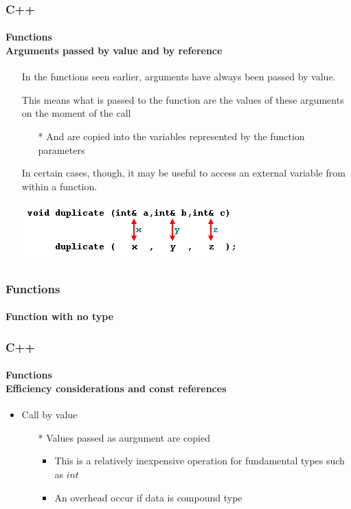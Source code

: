 \documentclass[hyperref={pdfpagelabels=true}]{beamer}
\begin{document}
\begin{frame}
\frametitle{C++}
\framesubtitle{{\small Functions} \\ {\scriptsize Arguments passed by value and by reference }}
\begin{itemize}
\item[\ding{39}] In the functions seen earlier, arguments have always been passed by value.
\item[\ding{39}] This means what is passed to the function are the values of these arguments on the moment of the call
  \begin{itemize}
  \item[*] And are copied into the variables represented by the function parameters
  \end{itemize}
\item[\ding{39}] In certain cases, though, it may be useful to access an external variable from within a function. 
\begin{center}
\includegraphics[width=8 cm,keepaspectratio]{figs/Selection_019.png}
\end{center}
\end{itemize}
\end{frame}

\begin{frame}
\frametitle{Functions}
\framesubtitle{Function with no type}
\begin{tcolorbox}[title= ,width=9.85 cm]

\end{tcolorbox}
\end{frame}


\begin{frame}
\frametitle{C++}
\framesubtitle{{\small Functions} \\ {\scriptsize Efficiency considerations and const references}}
\begin{itemize}
\item Call by value
  \begin{itemize}
  \item[*] Values passed as aurgument are copied
    \begin{itemize}
     \item This is a relatively inexpensive operation for fundamental types such as $int$
     \item  An overhead occur if data is compound type \\
    \end{itemize}
  \end{itemize}
{\tiny }
\end{itemize}

\end{frame}
\end{document}
